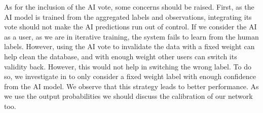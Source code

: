 As for the inclusion of the AI vote, some concerns should be raised.
First, as the AI model is trained from the aggregated labels and observations, integrating its vote should not make the AI predictions run out of control.
If we consider the AI as a user, as we are in iterative training, the system fails to learn from the human labels.
However, using the AI vote to invalidate the data with a fixed weight can help clean the database, and with enough weight other users can switch its validity back. However, this would not help in switching the wrong label.
To do so, we investigate in  to only consider a fixed weight label with enough confidence from the AI model.
We observe that this strategy leads to better performance.
As we use the output probabilities we should discuss the calibration of our network too.

